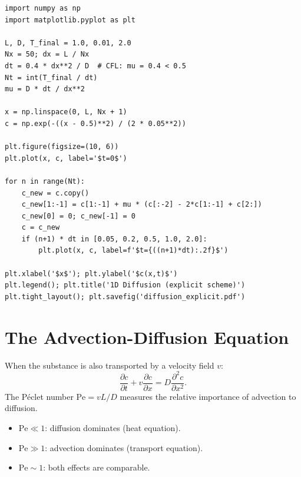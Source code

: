 \begin{codeblock}[title=\textbf{1D Diffusion --- explicit scheme}]
\begin{verbatim}
import numpy as np
import matplotlib.pyplot as plt

L, D, T_final = 1.0, 0.01, 2.0
Nx = 50; dx = L / Nx
dt = 0.4 * dx**2 / D  # CFL: mu = 0.4 < 0.5
Nt = int(T_final / dt)
mu = D * dt / dx**2

x = np.linspace(0, L, Nx + 1)
c = np.exp(-((x - 0.5)**2) / (2 * 0.05**2))

plt.figure(figsize=(10, 6))
plt.plot(x, c, label='$t=0$')

for n in range(Nt):
    c_new = c.copy()
    c_new[1:-1] = c[1:-1] + mu * (c[:-2] - 2*c[1:-1] + c[2:])
    c_new[0] = 0; c_new[-1] = 0
    c = c_new
    if (n+1) * dt in [0.05, 0.2, 0.5, 1.0, 2.0]:
        plt.plot(x, c, label=f'$t={((n+1)*dt):.2f}$')

plt.xlabel('$x$'); plt.ylabel('$c(x,t)$')
plt.legend(); plt.title('1D Diffusion (explicit scheme)')
plt.tight_layout(); plt.savefig('diffusion_explicit.pdf')
\end{verbatim}
\end{codeblock}

\section{The Advection-Diffusion Equation}
\label{sec:advection_diffusion}

\begin{definition}
When the substance is also transported by a velocity field $v$:
\[
  \frac{\partial c}{\partial t} + v\frac{\partial c}{\partial x}
  = D\frac{\partial^2 c}{\partial x^2}.
\]
The P\'eclet number $\mathrm{Pe}=vL/D$ measures the relative
importance of advection to diffusion.
\end{definition}

\begin{proposition}
\begin{itemize}
  \item $\mathrm{Pe}\ll 1$: diffusion dominates (heat equation).
  \item $\mathrm{Pe}\gg 1$: advection dominates (transport equation).
  \item $\mathrm{Pe}\sim 1$: both effects are comparable.
\end{itemize}
\end{proposition}

